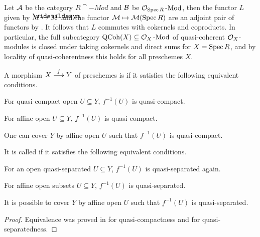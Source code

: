\documentclass[a4paper,parskip=half,numbers=enddot, DIV=12]{scrreprt}
\begin{document}
Let $\mathcal{A}$ be the category $R\cat{-Mod}$ and $\mathcal{B}$ be $\mathcal{O}_{\operatorname{Spec} R}\operatorname{-Mod}$, then the functor $L$ given by $M\mapsto\snake{M}$ and the functor $\mathcal{M}\mapsto\mathcal{M}(\operatorname{Spec} R)$ are an adjoint pair of functors by . It follows that $L$ commutes with cokernels and coproducts. In particular, the full subcategory $\operatorname{QCoh}(X)\subseteq\mathcal{O}_X\operatorname{-Mod}$ of quasi-coherent $\mathcal{O}_X$-modules is closed under taking cokernels and direct sums for $X=\operatorname{Spec} R$, and by locality of quasi-coherentness this holds for all preschemes $X$.
\begin{defi}
	A morphism $X\morphism[f]Y$ of preschemes is  if it satisfies the following equivalent conditions.
	\begin{alphanumerate}
		\item For quasi-compact open $U\subseteq Y$, $f^{-1}(U)$ is quasi-compact.
		\item For affine open $U\subseteq Y$, $f^{-1}(U)$ is quasi-compact.
		\item One can cover $Y$ by affine open $U$ such that $f^{-1}(U)$ is quasi-compact.
	\end{alphanumerate}
	It is called  if it satisfies the following equivalent conditions.
	\begin{alphanumerate}\setcounter{enumi}{3}
		\item For an open quasi-separated $U\subseteq Y$, $f^{-1}(U)$ is quasi-separated again.
		\item For affine open subsets $U\subseteq Y$, $f^{-1}(U)$ is quasi-separated.
		\item It is possible to cover $Y$ by affine open $U$ such that $f^{-1}(U)$ is quasi-separated.
	\end{alphanumerate}
\end{defi}
\begin{proof}
	Equivalence was proved in \cite[Fact~2.1.1]{alggeo1} for quasi-compactness and \cite[Lemma~2.1.1]{alggeo1} for quasi-separatedness.
\end{proof}
\end{document}
